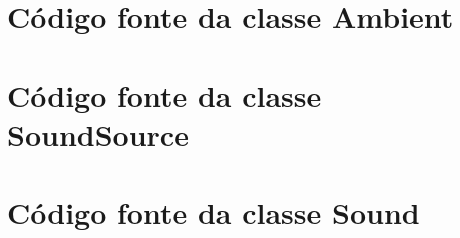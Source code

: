 \begin{apendicesenv}

\partapendices
\begin{comment}
\chapter{Documento de Arquitetura}

\section{Introdução}
Este documento apresenta a arquitetura proposta para o . A arquitetura é apresentada através de um conjunto de visões que juntas visam cobrir os principais aspectos técnicos relativos ao desenvolvimento e implantação do sistema em questão. O objetivo é capturar e formalizar as principais decisões tomadas com relação à arquitetura do sistema.

Neste documento é detalhado as principais partes da arquitetura implementada para a Ferramenta de Software desenvolvida. A arquitetura é composta por padrões de projetos orientados a objetos e por agentes comportamentais de Software. O Padrão Arquitetural adotado é o Model-View-Controller adaptado ao uso do paradigma Orientado a Agentes Comportamentais. Este documento contém ainda, uma proposta de refatoração
arquitetural no tocante aos Agentes implementados, tais sugestões foram obtidas através da experiência do desenvolvedor com o paradigma e como ele é interpretado pela plataforma JADE.

...
\end{comment}

\chapter{Código fonte da classe Ambient}



\chapter{Código fonte da classe SoundSource}




\chapter{Código fonte da classe Sound}


\end{apendicesenv}
